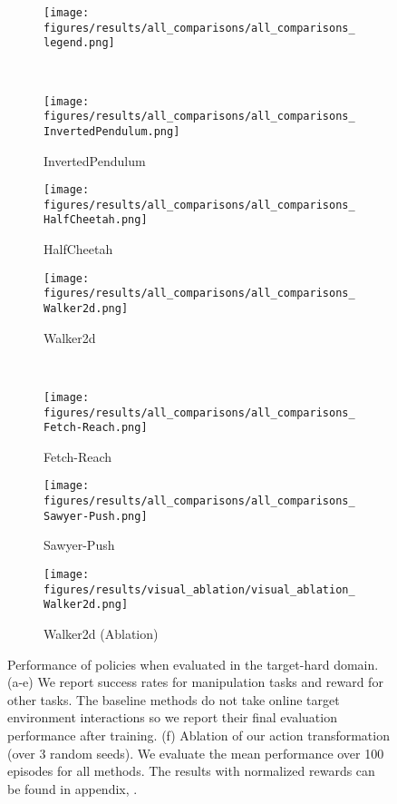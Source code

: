\begin{figure*}[t]
    \centering
    \begin{subfigure}[t]{0.75\linewidth}
        \centering
        \texttt{[image: figures/results/all\_comparisons/all\_comparisons\_legend.png]}
    \end{subfigure}
    \\
    \begin{subfigure}[t]{0.29\linewidth}
        \centering
        \texttt{[image: figures/results/all\_comparisons/all\_comparisons\_InvertedPendulum.png]}
        \caption{InvertedPendulum}
        \label{fig:result_step:invertedpendulum}
    \end{subfigure}
    \begin{subfigure}[t]{0.29\linewidth}
        \centering
        \texttt{[image: figures/results/all\_comparisons/all\_comparisons\_HalfCheetah.png]}
        \caption{HalfCheetah}
        \label{fig:result_step:halfcheetah}
    \end{subfigure}
    \begin{subfigure}[t]{0.29\linewidth}
        \centering
        \texttt{[image: figures/results/all\_comparisons/all\_comparisons\_Walker2d.png]}
        \caption{Walker2d}
        \label{fig:result_step:walker2d}
    \end{subfigure}
    \\
    \begin{subfigure}[t]{0.29\linewidth}
        \centering
        \texttt{[image: figures/results/all\_comparisons/all\_comparisons\_Fetch-Reach.png]}
        \caption{Fetch-Reach}
        \label{fig:result_step:fetchreach}
    \end{subfigure}
    \begin{subfigure}[t]{0.29\linewidth}
        \centering
        \texttt{[image: figures/results/all\_comparisons/all\_comparisons\_Sawyer-Push.png]}
        \caption{Sawyer-Push}
        \label{fig:result_step:sawyer_push}
    \end{subfigure}
    \begin{subfigure}[t]{0.29\linewidth}
        \centering
        \texttt{[image: figures/results/visual\_ablation/visual\_ablation\_Walker2d.png]}
        \caption{Walker2d (Ablation)}
        \label{fig:ablation}
    \end{subfigure}
    \caption{
    Performance of policies when evaluated in the target-hard domain.  (a-e) We report success rates for manipulation tasks and reward for other tasks. The baseline methods do not take online target environment interactions so we report their final evaluation performance after training.  (f) Ablation of our action transformation (over 3 random seeds). We evaluate the mean performance over 100 episodes for all methods. The results with normalized rewards can be found in appendix, .
    }
    \label{fig:result_step}
\label{fig:exps}
\end{figure*}


